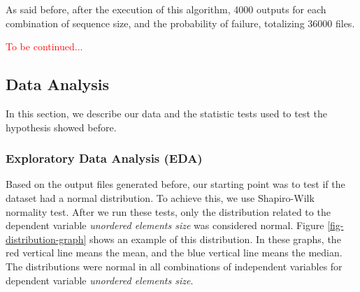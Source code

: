 As said before, after the execution of this algorithm, 4000 outputs for each combination of sequence size, and the probability of failure, totalizing 36000 files.

\textcolor{red}{To be continued...}

\subsection{Data Analysis}

In this section, we describe our data and the statistic tests used to test the hypothesis showed before.

\subsubsection{Exploratory Data Analysis (EDA)}

Based on the output files generated before, our starting point was to test if the dataset had a normal distribution. To achieve this, we use Shapiro-Wilk normality test. After we run these tests, only the distribution related to the dependent variable \textit{unordered elements size} was considered normal. Figure \ref{fig-distribution-graph} shows an example of this distribution. In these graphs, the red vertical line means the mean, and the blue vertical line means the median. The distributions were normal in all combinations of independent variables for dependent variable \textit{unordered elements size}.

